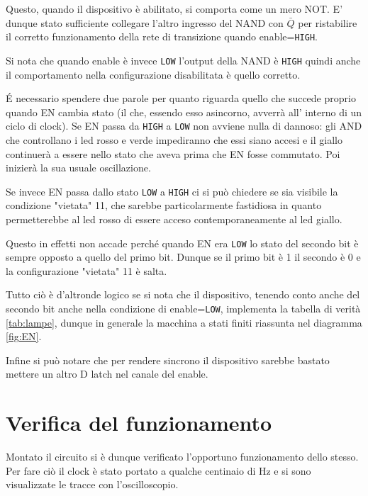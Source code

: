 \documentclass[a4paper,10pt]{article}
\def\code#1{\texttt{#1}}
\begin{document}
Questo, quando il dispositivo è abilitato, si comporta come un mero NOT. E' dunque stato sufficiente collegare l'altro ingresso del NAND con $\bar{Q}$ per ristabilire il corretto funzionamento della rete di transizione quando enable=\code{HIGH}.

Si nota che quando enable è invece \code{LOW} l'output della NAND è \code{HIGH} quindi anche il comportamento nella configurazione disabilitata è quello corretto.
\newline


\'E necessario spendere due parole per quanto riguarda quello che succede proprio quando EN cambia stato (il che, essendo esso asincorno, avverrà all' interno di un ciclo di clock). Se EN passa da \code{HIGH} a \code{LOW} non avviene nulla di dannoso: gli AND che controllano i led rosso e verde impediranno che essi siano accesi e il giallo continuerà a essere nello stato che aveva prima che EN fosse commutato. Poi inizierà la sua usuale oscillazione.

Se invece  EN passa dallo stato \code{LOW} a \code{HIGH} ci si può chiedere se sia visibile la condizione "vietata" 11, che sarebbe particolarmente fastidiosa in quanto permetterebbe al led rosso di essere acceso contemporaneamente al led giallo. 

Questo in effetti non accade perché quando EN era \code{LOW} lo stato del secondo bit è sempre opposto a quello del primo bit. Dunque se il primo bit è 1 il secondo è 0 e la configurazione "vietata" 11 è salta.

Tutto ciò è d'altronde logico se si nota che il dispositivo, tenendo conto anche del secondo bit anche nella condizione di enable=\code{LOW}, implementa la tabella di verità \cref{tab:lampe}, dunque in generale la macchina a stati finiti riassunta nel diagramma \cref{fig:EN}.
\newline



Infine si può notare che per rendere sincrono il dispositivo sarebbe bastato mettere un altro D latch nel canale del enable. 


\section{Verifica del funzionamento}

Montato il circuito si è dunque verificato l'opportuno funzionamento dello stesso. Per fare ciò il clock è stato portato a qualche centinaio di Hz e si sono visualizzate le tracce con l'oscilloscopio.
\end{document}

